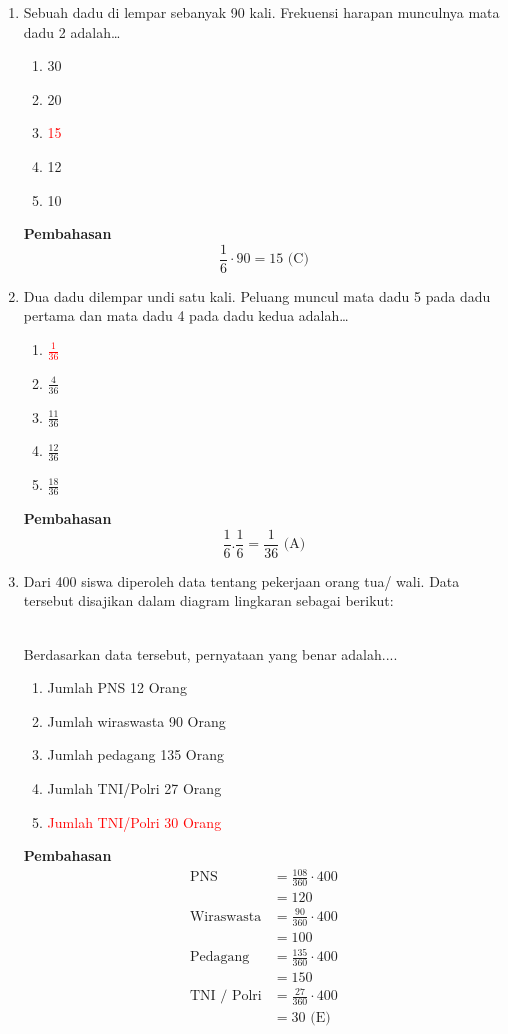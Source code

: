 \documentclass{report}
\newcommand{\options}[5]{
\begin{enumerate}[label=\alph*.]
	\item #1
	\item #2
	\item #3
	\item #4
	\item #5
\end{enumerate}
}
\newcommand{\pemb}{ \textbf{Pembahasan} \\}
\begin{document}
\begin{enumerate}
\item Sebuah dadu di lempar sebanyak 90 kali. Frekuensi harapan munculnya mata dadu 2 adalah\ldots
\options
{30}
{20}
{\textcolor{red}{15}}
{12}
{10}
\pemb
\[
	\frac{1}{6} \cdot 90=15\text{ (C)}
\]

\item Dua dadu dilempar undi satu kali. Peluang muncul mata dadu 5 pada dadu pertama dan mata dadu 4 pada dadu kedua adalah\ldots
\options
{\textcolor{red}{$\frac{1}{36}$}}
{$\frac{4}{36}$}
{$\frac{11}{36}$}
{$\frac{12}{36}$}
{$\frac{18}{36}$}
\pemb
\[
	\frac{1}{6}.\frac{1}{6} = \frac{1}{36} \text{ (A)}
\]
\item Dari 400 siswa diperoleh data tentang pekerjaan orang tua/ wali. Data tersebut disajikan dalam diagram lingkaran sebagai berikut:\\
	 \\
Berdasarkan data tersebut, pernyataan yang benar adalah....
\options
{Jumlah PNS 12 Orang}
{Jumlah wiraswasta 90 Orang}
{Jumlah pedagang 135 Orang}
{Jumlah TNI/Polri 27 Orang}
{\textcolor{red}{Jumlah TNI/Polri 30 Orang}}
\pemb
\begin{align*}
	\text{PNS} &= \frac{108}{360} \cdot 400 \\
	    &= 120 \\
	\text{Wiraswasta}&= \frac{90}{360} \cdot 400 \\
	    &= 100 \\
	\text{Pedagang} &= \frac{135}{360} \cdot 400 \\
	    &= 150 \\
	\text{TNI / Polri} &= \frac{27}{360} \cdot 400 \\
	    &= 30 \text{ (E)}
\end{align*}


\end{enumerate}
\end{document}
